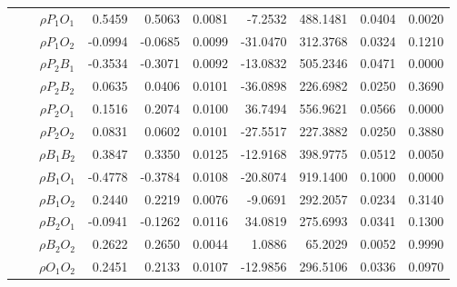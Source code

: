 \documentclass[letterpaper]{article}
\begin{document}
\begin{table}[h]
\begin{tabular}{cccrrrrrrr}
            &             & $\rho{P_1O_1}$ & 0.5459                 & 0.5063                 & 0.0081                 & -7.2532                & 488.1481               & 0.0404                   & 0.0020                 \\
            &             & $\rho{P_1O_2}$ & -0.0994                & -0.0685                & 0.0099                 & -31.0470               & 312.3768               & 0.0324                   & 0.1210                 \\
            &             & $\rho{P_2B_1}$ & -0.3534                & -0.3071                & 0.0092                 & -13.0832               & 505.2346               & 0.0471                   & 0.0000                 \\
            &             & $\rho{P_2B_2}$ & 0.0635                 & 0.0406                 & 0.0101                 & -36.0898               & 226.6982               & 0.0250                   & 0.3690                 \\
            &             & $\rho{P_2O_1}$ & 0.1516                 & 0.2074                 & 0.0100                 & 36.7494                & 556.9621               & 0.0566                   & 0.0000                 \\
            &             & $\rho{P_2O_2}$ & 0.0831                 & 0.0602                 & 0.0101                 & -27.5517               & 227.3882               & 0.0250                   & 0.3880                 \\
            &             & $\rho{B_1B_2}$ & 0.3847                 & 0.3350                 & 0.0125                 & -12.9168               & 398.9775               & 0.0512                   & 0.0050                 \\
            &             & $\rho{B_1O_1}$ & -0.4778                & -0.3784                & 0.0108                 & -20.8074               & 919.1400               & 0.1000                   & 0.0000                 \\
            &             & $\rho{B_1O_2}$ & 0.2440                 & 0.2219                 & 0.0076                 & -9.0691                & 292.2057               & 0.0234                   & 0.3140                 \\
            &             & $\rho{B_2O_1}$ & -0.0941                & -0.1262                & 0.0116                 & 34.0819                & 275.6993               & 0.0341                   & 0.1300                 \\
            &             & $\rho{B_2O_2}$ & 0.2622                 & 0.2650                 & 0.0044                 & 1.0886                 & 65.2029                & 0.0052                   & 0.9990                 \\
            &             & $\rho{O_1O_2}$ & 0.2451                 & 0.2133                 & 0.0107                 & -12.9856               & 296.5106               & 0.0336                   & 0.0970                 \\ \hline
\end{tabular}
\end{table}
\end{document}

